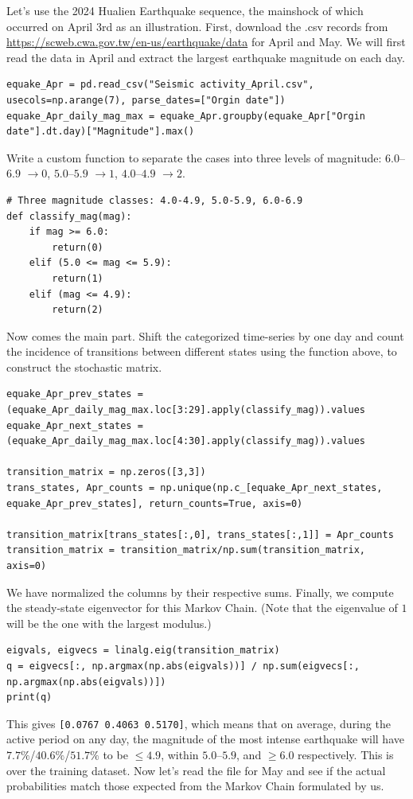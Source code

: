 Let's use the 2024 Hualien Earthquake sequence, the mainshock of which occurred on April 3rd as an illustration. First, download the .csv records from \href{https://scweb.cwa.gov.tw/en-us/earthquake/data}{https://scweb.cwa.gov.tw/en-us/earthquake/data} for April and May. We will first read the data in April and extract the largest earthquake magnitude on each day.
\begin{lstlisting}
equake_Apr = pd.read_csv("Seismic activity_April.csv", usecols=np.arange(7), parse_dates=["Orgin date"])
equake_Apr_daily_mag_max = equake_Apr.groupby(equake_Apr["Orgin date"].dt.day)["Magnitude"].max()
\end{lstlisting}
Write a custom function to separate the cases into three levels of magnitude: $6.0$--$6.9$ $\to 0$, $5.0$--$5.9$ $\to 1$, $4.0$--$4.9$ $\to 2$.
\begin{lstlisting}
# Three magnitude classes: 4.0-4.9, 5.0-5.9, 6.0-6.9
def classify_mag(mag):
    if mag >= 6.0:
        return(0)
    elif (5.0 <= mag <= 5.9):
        return(1)
    elif (mag <= 4.9):
        return(2) 
\end{lstlisting}
Now comes the main part. Shift the categorized time-series by one day and count the incidence of transitions between different states using the function above, to construct the stochastic matrix.
\begin{lstlisting}
equake_Apr_prev_states = (equake_Apr_daily_mag_max.loc[3:29].apply(classify_mag)).values
equake_Apr_next_states = (equake_Apr_daily_mag_max.loc[4:30].apply(classify_mag)).values

transition_matrix = np.zeros([3,3])
trans_states, Apr_counts = np.unique(np.c_[equake_Apr_next_states, equake_Apr_prev_states], return_counts=True, axis=0)

transition_matrix[trans_states[:,0], trans_states[:,1]] = Apr_counts
transition_matrix = transition_matrix/np.sum(transition_matrix, axis=0)
\end{lstlisting}
We have normalized the columns by their respective sums. Finally, we compute the steady-state eigenvector for this Markov Chain. (Note that the eigenvalue of $1$ will be the one with the largest modulus.)
\begin{lstlisting}
eigvals, eigvecs = linalg.eig(transition_matrix)
q = eigvecs[:, np.argmax(np.abs(eigvals))] / np.sum(eigvecs[:, np.argmax(np.abs(eigvals))])
print(q)
\end{lstlisting}
This gives \verb|[0.0767 0.4063 0.5170]|, which means that on average, during the active period on any day, the magnitude of the most intense earthquake will have $7.7\%$/$40.6\%$/$51.7\%$ to be $\leq 4.9$, within $5.0$--$5.9$, and $\geq 6.0$ respectively. This is over the training dataset. Now let's read the file for May and see if the actual probabilities match those expected from the Markov Chain formulated by us.
